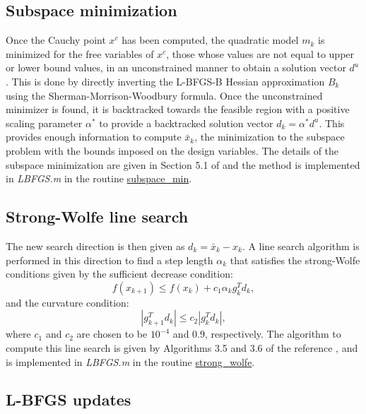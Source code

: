 \documentclass[11pt]{article}
\begin{document}
\subsection{Subspace minimization}

Once the Cauchy point $x^c$ has been computed, the
quadratic model $m_k$ is minimized for the free
variables of $x^c$, those whose values are not equal to upper
or lower bound values, in an unconstrained manner to
obtain a solution vector $d^u$. This is done by directly
inverting the L-BFGS-B Hessian approximation $B_k$ using
the Sherman-Morrison-Woodbury formula. Once the unconstrained minimizer
is found, it is backtracked towards the feasible region with a
positive scaling parameter $\alpha^*$ to provide a backtracked solution
vector $d_k = \alpha^* d^u$. This provides enough information to compute
$\bar{x}_k$, the minimization to the subspace problem with
the bounds imposed on the design variables.
The details of the subspace minimization
are given in Section 5.1 of \cite{lbfgsb} and the method
is implemented
in \emph{LBFGS.m} in the routine
\href{https://github.com/bgranzow/L-BFGS-B/blob/master/LBFGSB.m#L358}
{subspace\_min}.

\subsection{Strong-Wolfe line search}

The new search direction is then given as $d_k = \bar{x}_k - x_k$.
A line search algorithm is performed in this direction to find
a step length $\alpha_k$ that satisfies the strong-Wolfe
conditions given by the sufficient decrease condition:
%
\begin{equation}
f(x_{k+1}) \leq f(x_k) + c_1 \alpha_k g_k^T d_k,
\end{equation}
%
and the curvature condition:
%
\begin{equation}
| g^T_{k+1}  d_k | \leq c_2 | g^T_k d_k |,
\end{equation}
%
where $c_1$ and $c_2$ are chosen to be $10^{-4}$ and
$0.9$, respectively.
The algorithm to compute this line search is given
by Algorithms 3.5 and 3.6 of the reference
\cite{optimization}, and is implemented in
\emph{LBFGS.m} in the routine
\href{https://github.com/bgranzow/L-BFGS-B/blob/master/LBFGSB.m#L427}
{strong\_wolfe}.

\subsection{L-BFGS updates}
\end{document}
